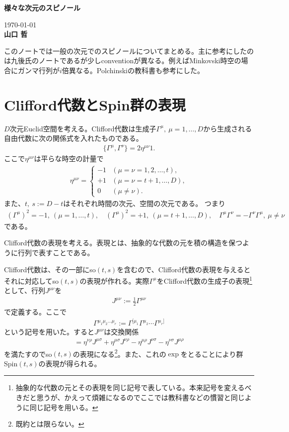 \documentclass[12pt,a4paper,dvipdfmx]{jlreq}
\begin{document}
\begin{center}
  {\bfseries \LARGE 様々な次元のスピノール}
\end{center}
\begin{flushright}
  \today\\
  {\bfseries 山口 哲}
\end{flushright}
\vspace{1cm}
このノートでは一般の次元でのスピノールについてまとめる。主に参考にしたのは九後氏のノート\cite{Kugo}であるが少しconventionが異なる。例えばMinkovski時空の場合にガンマ行列が$i$倍異なる。Polchinskiの教科書\cite{Polchinski}も参考にした。
\setcounter{tocdepth}{1}
\tableofcontents

\section{Clifford代数とSpin群の表現}
$D$次元Euclid空間を考える。Clifford代数は生成子$\Gamma^{\mu},\ \mu=1,\dots,D$から生成される自由代数に次の関係式を入れたものである。
\begin{align}
  \{\Gamma^{\mu},\Gamma^{\nu}\}=2\eta^{\mu\nu} 1.
  \label{genClifford}
\end{align}
ここで$\eta^{\mu\nu}$は平らな時空の計量で
\begin{align*}
  \eta^{\mu\nu}=
  \begin{cases}
    -1 & (\mu=\nu=1,2,\dots,t),\\
    +1 & (\mu=\nu=t+1,\dots,D),\\
    0 & (\mu\ne\nu).
  \end{cases}
\end{align*}
また、$t,\ s:=D-t$はそれぞれ時間の次元、空間の次元である。
つまり
\begin{align}
  (\Gamma^{\mu})^2=-1,\ (\mu=1,\dots,t),\quad(\Gamma^{\mu})^2=+1,\ (\mu=t+1,\dots,D),\quad \Gamma^{\mu}\Gamma^{\nu}=-\Gamma^{\nu}\Gamma^{\mu},\ \mu\ne\nu
\end{align}
である。

Clifford代数の表現を考える。表現とは、抽象的な代数の元を積の構造を保つように行列で表すことである。

Clifford代数は、その一部にso$(t,s)$を含むので、Clifford代数の表現を与えるとそれに対応してso$(t,s)$の表現が作れる。実際$\Gamma^{\mu}$をClifford代数の生成子の表現\footnote{抽象的な代数の元とその表現を同じ記号で表している。本来記号を変えるべきだと思うが、かえって煩雑になるのでここでは教科書などの慣習と同じように同じ記号を用いる。}として、行列$J^{\mu\nu}$を
\begin{align*}
  J^{\mu\nu}:=\frac12 \Gamma^{\mu\nu}
\end{align*}
で定義する。ここで
\begin{align*}
  \Gamma^{\mu_1\mu_2\dots \mu_r}:=\Gamma^{[\mu_1}\Gamma^{\mu_2}\cdots\Gamma^{\mu_r]}
\end{align*}
という記号を用いた。すると$J^{\mu\nu}$は交換関係
\begin{align*}
  [J^{\mu\nu},J^{\rho\sigma}]=
  \eta^{\nu\rho}J^{\mu\sigma}
  +\eta^{\mu\sigma}J^{\nu\rho}
  -\eta^{\mu\rho}J^{\nu\sigma}
  -\eta^{\nu\sigma}J^{\mu\rho}
\end{align*}
を満たすのでso$(t,s)$の表現になる\footnote{既約とは限らない。}。また、これの$\exp$をとることにより群Spin$(t,s)$の表現が得られる。
\end{document}
